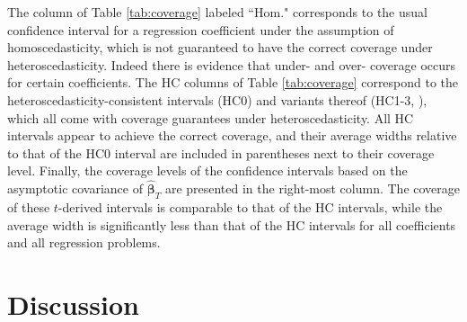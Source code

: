 \documentclass[12pt]{article}
\newcommand{\bs}[1]{\boldsymbol #1}
\begin{document}
The column of Table \ref{tab:coverage} labeled ``Hom."  corresponds to the usual confidence interval for a regression coefficient under the assumption of homoscedasticity, which is not guaranteed to have the correct coverage under heteroscedasticity. Indeed there is evidence that under- and over- coverage occurs for certain coefficients. The HC columns of Table \ref{tab:coverage} correspond to the \cite{white_heteroskedasticity-consistent_1980} heteroscedasticity-consistent intervals (HC0) and variants thereof (HC1-3, \citealp{mackinnon_heteroskedasticity-consistent_1985}), which all come with coverage guarantees under heteroscedasticity. All HC intervals appear to achieve the correct coverage, and their average widths relative to that of the HC0 interval are included in parentheses next to their coverage level. Finally, the coverage levels of the confidence intervals based on the asymptotic covariance of $\hat{\bs{\beta}}_T$ are presented in the right-most column. The coverage of these $t$-derived intervals is comparable to that of the HC intervals, while the average width is significantly less than that of the HC intervals for all coefficients and all regression problems.


\section{Discussion}\label{sec:disc}
\end{document}
